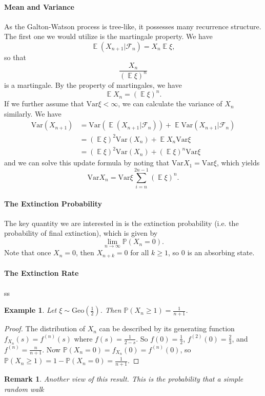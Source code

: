 \documentclass{article}
\newtheorem{Eg}{Example}[section]
\newtheorem*{Rk}{Remark}
\theoremstyle{definition}
\newcommand{\EE}{\operatorname{\mathbb{E}}}
\newcommand{\PP}{\mathbb{P}}
\newcommand{\cF}{\mathcal{F}}
\newcommand{\var}{\text{Var}}
\begin{document}
\paragraph{Mean and Variance} As the Galton-Watson process is tree-like, it possesses many recurrence structure.
The first one we would utilize is the martingale property. We have 
\[\EE(X_{n+1}|\cF_n)=X_n\EE \xi ,\]
so that \[\frac{X_n}{(\EE \xi)^n}\]
is a martingale. By the property of martingales, we have 
\[\EE X_{n}=(\EE \xi)^n.\]
If we further assume that $\var \xi<\infty$, we can calculate the variance of $X_n$ similarly. 
We have
\begin{align*}
    \var (X_{n+1}) &= \var (\EE(X_{n+1}|\cF_n))+\EE \var(X_{n+1}|\cF_n)\\
    &=(\EE \xi)^2\var(X_n)+\EE X_n \var \xi\\
    &=(\EE \xi)^2\var(X_n)+(\EE \xi)^n \var \xi
\end{align*}
and we can solve this update formula by noting that $\var X_{1}=\var \xi $, which yields
\[\var X_{n}=\var \xi \sum_{i=n}^{2n-1} (\EE \xi)^n.\]

\paragraph{The Extinction Probability} The key quantity we are interested in is the
extinction probability (i.e. the probability of final extinction), which is given by
\[ \lim_{n\to\infty}\PP(X_n=0).\]
Note that once $X_n=0$, then $X_{n+k}=0$ for all $k\geq 1$, so $0$ is an absorbing state.



\paragraph{The Extinction Rate} ss

\begin{Eg}
    Let $\xi\sim\text{Geo}(\frac{1}{2})$. Then $\PP(X_n \geq 1)=\frac{1}{n+1}$.
\end{Eg}
\begin{proof}
    The distribution of $X_n$ can be described by its generating function $f_{X_n}(s)=f^{(n)}(s)$
    where $f(s)=\frac{1}{2-s}$. So $f(0)=\frac{1}{2}$, $f^{(2)}(0)=\frac{2}{3}$, and $f^{(n)}=\frac{n}{n+1}$.
    Now $\PP(X_n=0)=f_{X_n}(0)=f^{(n)}(0)$, so $\PP(X_n \geq 1)=1-\PP(X_n = 0)=\frac{1}{n+1}$.
\end{proof}
\begin{Rk}
    Another view of this result.
    This is the probability that a simple random walk 
\end{Rk}
\end{document}
